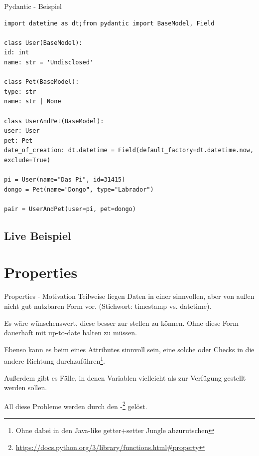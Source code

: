 \documentclass[12pt, aspectratio=169, usepdftitle=false]{beamer}
\newcommand{\pp}[1]{\lpl{#1}}
\newcommand{\furl}[1]{\footnote{\url{#1}}}
\begin{document}
\begin{frame}[fragile]{Pydantic - Beispiel}
	\begin{lstlisting}[language=pytiny]		
import datetime as dt;from pydantic import BaseModel, Field

class User(BaseModel):
id: int
name: str = 'Undisclosed'

class Pet(BaseModel):
type: str
name: str | None

class UserAndPet(BaseModel):
user: User
pet: Pet
date_of_creation: dt.datetime = Field(default_factory=dt.datetime.now, exclude=True)

pi = User(name="Das Pi", id=31415)
dongo = Pet(name="Dongo", type="Labrador")

pair = UserAndPet(user=pi, pet=dongo)
	\end{lstlisting}
\end{frame}

\subsection{Live Beispiel}

\framecardfragen

\section{Properties}

\begin{frame}{Properties - Motivation}
        Teilweise liegen Daten in einer  sinnvollen, aber von außen nicht gut nutzbaren Form vor. (Stichwort: timestamp vs. datetime).
		
		\medskip
		
		Es wäre wünschenswert, diese  besser zur  stellen zu können.\newline
		Ohne diese Form dauerhaft mit up-to-date halten zu müssen.
		
		\medskip
		
		Ebenso kann es beim  eines Attributes sinnvoll sein, eine solche  oder Checks in die andere Richtung durchzuführen\footnote{Ohne dabei in den Java-like getter+setter Jungle abzurutschen}.
		
		\medskip
		
		Außerdem gibt es Fälle, in denen Variablen vielleicht als  zur Verfügung gestellt werden sollen.
		
		\medskip
		
		All diese Probleme werden durch den \pp{@property}-\furl{https://docs.python.org/3/library/functions.html\#property} gelöst.

\end{frame}
\end{document}
